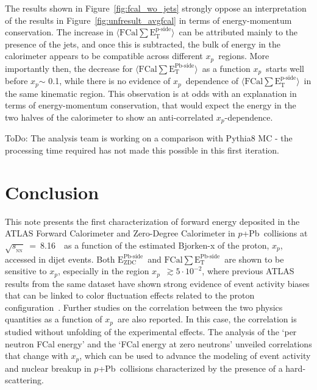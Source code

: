 \documentclass[NOTE, atlasdraft=true, texlive=2020, UKenglish]{atlasdoc}
\newcommand{\EZDC}{$\text{E}_\text{ZDC}^\text{Pb-side}$}
\newcommand{\EATPB}{$\langle \text{FCal} \sum \text{E}_{\text{T}}^{\text{Pb-side} } \rangle$}
\newcommand{\EATP}{$\langle \text{FCal} \sum \text{E}_{\text{T}}^{\text{p-side} }\rangle$}
\newcommand{\ETPB}{$\text{FCal} \sum \text{E}_{\text{T}}^{\text{Pb-side} }$}
\newcommand{\xp}{$x_{p}$}
\newcommand{\SNN}{\ensuremath{\sqrt{s_{_\text{NN}}}}}
\newcommand{\pxPb}{$p$+Pb}
\begin{document}
The results shown in Figure~\ref{fig:fcal_wo_jets} strongly oppose an interpretation of the results in Figure~\ref{fig:unfresult_avgfcal} in terms of energy-momentum conservation. The increase in \EATP\ can be attributed mainly to the presence of the jets, and once this is subtracted, the bulk of energy in the calorimeter appears to be compatible across different \xp\ regions. More importantly then, the decrease for \EATPB\ as a function \xp\ starts well before \xp $\sim$ 0.1, while there is no evidence of \xp\ dependence of \EATP\ in the same kinematic region. This observation is at odds with an explanation in terms of energy-momentum conservation, that would expect the energy in the two halves of the calorimeter to show an anti-correlated \xp-dependence. 

{\color{red}ToDo: The analysis team is working on a comparison with Pythia8 MC - the processing time required has not made this possible in this first iteration.}

\clearpage



\clearpage{}
\clearpage{}\section{Conclusion}
\label{sec:conclusion}



This note presents the first characterization of forward energy deposited in the ATLAS Forward Calorimeter and Zero-Degree Calorimeter in \pxPb\ collisions at \SNN~=~8.16~\TeV\ as a function of the estimated Bjorken-x of the proton, \xp, accessed in dijet events. 
Both \EZDC\ and \ETPB\ are shown to be sensitive to \xp, especially in the region \xp~$\gtrsim 5\cdot10^{-2}$, where previous ATLAS results from the same dataset \cite{ATLAS:2023zfx} have shown strong evidence of event activity biases that can be linked to color fluctuation effects related to the proton configuration~\cite{Alvioli:2017wou}. 
Further studies on the correlation between the two physics quantities as a function of \xp\ are also reported. In this case, the correlation is studied without unfolding of the experimental effects. The analysis of the `per neutron FCal energy' and the `FCal energy at zero neutrons’ unveiled correlations that change with \xp, which can be used to advance the modeling of event activity and nuclear breakup in \pxPb\ collisions characterized by the presence of a hard-scattering. 
\end{document}
